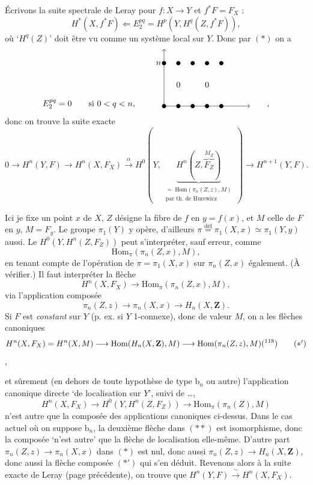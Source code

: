 Écrivons la suite spectrale de Leray pour $f : X \longrightarrow Y$ et $f^*F = F_X$ :
\[
H^*(X,f^*F) \Longleftarrow E_2^{pq} = H^p(Y,H^q(Z,f^*F)),
\]
où ‘$H^q(Z)$’ doit être vu comme un système local sur $Y$. Donc par $(*)$ on a
\[
E_2^{pq}=0 \qquad \text{si } 0<q<n, \qquad
\begin{tikzpicture}[baseline=0pt, x=0.6cm, y=0.6cm]
\draw[->] (0,0) -- (0,4);
\draw[->] (0,0) -- (6,0);
\node[left] at (0,3) {$n$};
\foreach \i in {0,...,4} { \fill (\i,3) circle (2.5pt); \fill (\i,0) circle (2.5pt); }
\node at (1,1.5) {$0$};
\node at (3,1.5) {$0$};
\end{tikzpicture}
\qquad ,
\]
donc on trouve la suite exacte
\[
0 \longrightarrow H^n(Y,F) \longrightarrow H^n(X,F_X) \xrightarrow{\ \alpha\ } H^0(Y,\ \underbrace{H^n(Z,\overbrace{F_Z}^{M_Z})}_{\begin{array}{l}\scriptstyle = \ \mathrm{Hom}(\pi_n(Z,z),M)\\ \scriptstyle \text{par th. de Hurewicz}\end{array}}\ ) \longrightarrow H^{n+1}(Y,F).
\]


Ici je fixe un point $x$ de $X$, $Z$ désigne la fibre de $f$ en $y=f(x)$, et $M$ celle de $F$ en $y$, $M=F_y$. Le groupe $\pi_1(Y)$ y opère, d’ailleurs $\pi \overset{\text{déf}}{=} \pi_1(X,x) \simeq \pi_1(Y,y)$ aussi. Le $H^0(Y,H^n(Z,F_Z))$ peut s’interpréter, sauf erreur, comme
\[
\mathrm{Hom}_\pi(\pi_n(Z,x),M),
\]
en tenant compte de l’opération de $\pi=\pi_1(X,x)$ sur $\pi_n(Z,x)$ également. (À vérifier.) Il faut interpréter la flèche
\[
H^n(X,F_X) \longrightarrow \mathrm{Hom}_\pi(\pi_n(Z,x),M),
\]
via l’application composée
\[
\pi_n(Z,z) \longrightarrow \pi_n(X,x) \longrightarrow H_n(X,\mathbf{Z}). \tag*{$(*)$}
\]
Si $F$ est \textit{constant} sur $Y$ (p. ex. si $Y$ 1-connexe), donc de valeur $M$, on a les flèches canoniques
\[
H^n(X,F_X) = H^n(X,M) \longrightarrow \mathrm{Hom}(H_n(X,\mathbf{Z}),M) \longrightarrow \mathrm{Hom}(\pi_n(Z,z),M)\text{(\footnotemark[118])} \tag*{$(*')$}
\]
,

et sûrement (en dehors de toute hypothèse de type $\mathrm{b}_n$ ou autre) l’application canonique directe ‘de localisation sur $Y$’, suivi de \dots,
\[
H^n(X,F_X) \longrightarrow H^0(Y,H^n(Z,F_Z)) \longrightarrow \mathrm{Hom}_\pi(\pi_n(Z),M) \tag*{$(**)$}
\]
n’est autre que la composée des applications canoniques ci-dessus. Dans le cas actuel où on suppose $\mathrm{b}_n$, la deuxième flèche dans $(**)$ est isomorphisme, donc la composée ‘n’est autre’ que la flèche de localisation elle-même. D’autre part $\pi_n(Z,z) \longrightarrow \pi_n(X,x)$ dans $(*)$ est nul, donc aussi $\pi_n(Z,z) \longrightarrow H_n(X,\mathbf{Z})$, donc aussi la flèche composée $(*')$ qui s’en déduit. Revenons alors à la suite exacte de Leray (page précédente), on trouve que $H^n(Y,F) \xrightarrow{\ \sim\ } H^n(X,F_X)$.

